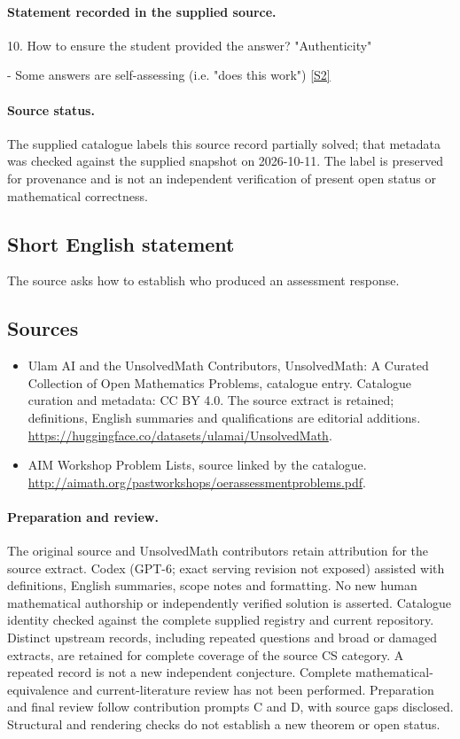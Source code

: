 \documentclass[11pt]{article}
\begin{document}
\paragraph{Statement recorded in the supplied source.}
10. How to ensure the student provided the answer? "Authenticity"

- Some answers are self-assessing (i.e. "does this work") \href{http://aimath.org/pastworkshops/oerassessmentproblems.pdf}{[S2]}
\paragraph{Source status.}
The supplied catalogue labels this source record partially solved; that metadata was checked against the supplied snapshot on 2026-10-11. The label is preserved for provenance and is not an independent verification of present open status or mathematical correctness.
\subsection{Short English statement}
The source asks how to establish who produced an assessment response.
\subsection{Sources}
\begin{itemize}
\item[S1] Ulam AI and the UnsolvedMath Contributors, UnsolvedMath: A Curated Collection of Open Mathematics Problems, catalogue entry. Catalogue curation and metadata: CC BY 4.0. The source extract is retained; definitions, English summaries and qualifications are editorial additions.
\url{https://huggingface.co/datasets/ulamai/UnsolvedMath}.
\item[S2] AIM Workshop Problem Lists, source linked by the catalogue.
\url{http://aimath.org/pastworkshops/oerassessmentproblems.pdf}.
\end{itemize}
\paragraph{Preparation and review.}
The original source and UnsolvedMath contributors retain attribution for the source extract. Codex (GPT-6; exact serving revision not exposed) assisted with definitions, English summaries, scope notes and formatting. No new human mathematical authorship or independently verified solution is asserted. Catalogue identity checked against the complete supplied registry and current repository. Distinct upstream records, including repeated questions and broad or damaged extracts, are retained for complete coverage of the source CS category. A repeated record is not a new independent conjecture. Complete mathematical-equivalence and current-literature review has not been performed. Preparation and final review follow contribution prompts C and D, with source gaps disclosed. Structural and rendering checks do not establish a new theorem or open status.
\label{end:statement}
\end{document}
